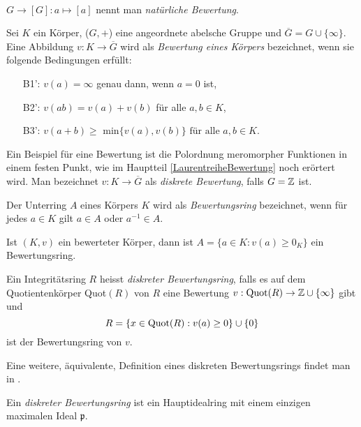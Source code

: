  \\$G \to [G] \colon a \mapsto [a]$ nennt man \textit{natürliche Bewertung}. %
\begin{defn}  \label{bewKoerper} %
Sei $K$ ein Körper, ($G, +$) eine angeordnete abelsche Gruppe und $\overline{G}  = G \cup \lbrace\infty\rbrace $. Eine Abbildung $v\colon K \to \overline{G} $ wird als \textit{Bewertung eines Körpers} bezeichnet, wenn sie folgende Bedingungen erfüllt:
\begin{enumerate}
\item[B1':] $v(a) = \infty$ genau dann, wenn $a = 0$ ist,
\item[B2':] $v(ab) = v\left(a\right)+v\left(b\right) $ für alle $ a, b \in K$,
\item[B3':] $v\left(a+b\right) \ge $ min$\lbrace v(a),v\left(b \right)\rbrace \text{ für alle }  a, b \in K. $
\end{enumerate}
\end{defn}
Ein Beispiel für eine Bewertung ist die Polordnung meromorpher Funktionen in einem festen Punkt, wie im Hauptteil \ref*{LaurentreiheBewertung} noch erörtert wird. 
Man bezeichnet $v\colon K \to \overline{G} $ als \textit{diskrete Bewertung}, falls ${G} = \mathbb{Z}$ ist.
%
\begin{defn} %
Der Unterring $A$ eines Körpers $K$ wird als \textit{Bewertungsring} bezeichnet, wenn für jedes $a\in K$ gilt $a \in A$ oder $a^{-1}\in A$.
\end{defn}
\begin{bem}
Ist $\left(K, v\right)$ ein bewerteter Körper, dann ist $A = \lbrace a \in K\colon v(a) \geq 0_K\rbrace$ ein Bewertungsring.
\end{bem}
\begin{defn}   %
Ein Integritätsring $R$ heisst \textit{diskreter Bewertungsring}, falls es auf dem Quotientenkörper \textup{Quot}$(R)$ von $R$ eine Bewertung $v: \textup{Quot}(R) \rightarrow \mathbb{Z} \cup \lbrace\infty\rbrace$ gibt und 
\[R = \lbrace x \in \textup{Quot}(R): v(a) \ge 0 \rbrace \cup \lbrace 0 \rbrace\]
ist der Bewertungsring von $v$.
\end{defn}
Eine weitere, äquivalente, Definition eines diskreten Bewertungsrings findet man in \cite[S. 126]{neukirch92}.
\begin{defn} \label{bewertungsring}%
Ein \textit{diskreter Bewertungsring} ist ein Hauptidealring mit einem einzigen maximalen Ideal $\mathfrak{p}$.
\end{defn} 
%
%

